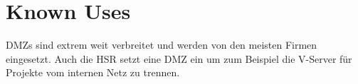 \section{Known Uses}
DMZs sind extrem weit verbreitet und werden von den meisten Firmen eingesetzt. Auch die HSR setzt eine DMZ ein um zum Beispiel die V-Server für Projekte vom internen Netz zu trennen.

